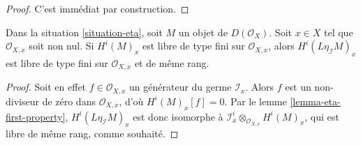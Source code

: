 \begin{proof}
C'est immédiat par construction.
\end{proof}

\begin{lemma}

\label{lemma-eta-cohomology-locally-free}
Dans la situation \ref{situation-eta}, soit $M$ un objet de $D(\mathcal{O}_X)$. Soit $x \in X$ tel que $\mathcal{O}_{X, x}$ soit non nul. Si $H^i(M)_x$ est libre de type fini sur $\mathcal{O}_{X, x}$, alors $H^i(L\eta_\mathcal{I}M)_x$ est libre de type fini sur $\mathcal{O}_{X, x}$ et de même rang.
\end{lemma}

\begin{proof}
Soit en effet $f \in \mathcal{O}_{X, x}$ un générateur du germe $\mathcal{I}_x$. Alors $f$ est un non-diviseur de zéro dans $\mathcal{O}_{X, x}$, d'où $H^i(M)_x[f] = 0$. Par le lemme \ref{lemma-eta-first-property}, $H^i(L\eta_\mathcal{I}M)_x$ est donc isomorphe à $\mathcal{I}^i_x \otimes_{\mathcal{O}_{X, x}} H^i(M)_x$, qui est libre de même rang, comme souhaité.
\end{proof}











 


